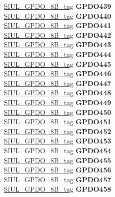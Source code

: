 \begin{DoxyCompactItemize}
\begin{tabbing}
\>\>\mbox{\hyperlink{unionSIUL__GPDO__8B__tag}{SIUL\_GPDO\_8B\_tag}} {\bfseries GPDO439}\\
\>\>\mbox{\hyperlink{unionSIUL__GPDO__8B__tag}{SIUL\_GPDO\_8B\_tag}} {\bfseries GPDO440}\\
\>\>\mbox{\hyperlink{unionSIUL__GPDO__8B__tag}{SIUL\_GPDO\_8B\_tag}} {\bfseries GPDO441}\\
\>\>\mbox{\hyperlink{unionSIUL__GPDO__8B__tag}{SIUL\_GPDO\_8B\_tag}} {\bfseries GPDO442}\\
\>\>\mbox{\hyperlink{unionSIUL__GPDO__8B__tag}{SIUL\_GPDO\_8B\_tag}} {\bfseries GPDO443}\\
\>\>\mbox{\hyperlink{unionSIUL__GPDO__8B__tag}{SIUL\_GPDO\_8B\_tag}} {\bfseries GPDO444}\\
\>\>\mbox{\hyperlink{unionSIUL__GPDO__8B__tag}{SIUL\_GPDO\_8B\_tag}} {\bfseries GPDO445}\\
\>\>\mbox{\hyperlink{unionSIUL__GPDO__8B__tag}{SIUL\_GPDO\_8B\_tag}} {\bfseries GPDO446}\\
\>\>\mbox{\hyperlink{unionSIUL__GPDO__8B__tag}{SIUL\_GPDO\_8B\_tag}} {\bfseries GPDO447}\\
\>\>\mbox{\hyperlink{unionSIUL__GPDO__8B__tag}{SIUL\_GPDO\_8B\_tag}} {\bfseries GPDO448}\\
\>\>\mbox{\hyperlink{unionSIUL__GPDO__8B__tag}{SIUL\_GPDO\_8B\_tag}} {\bfseries GPDO449}\\
\>\>\mbox{\hyperlink{unionSIUL__GPDO__8B__tag}{SIUL\_GPDO\_8B\_tag}} {\bfseries GPDO450}\\
\>\>\mbox{\hyperlink{unionSIUL__GPDO__8B__tag}{SIUL\_GPDO\_8B\_tag}} {\bfseries GPDO451}\\
\>\>\mbox{\hyperlink{unionSIUL__GPDO__8B__tag}{SIUL\_GPDO\_8B\_tag}} {\bfseries GPDO452}\\
\>\>\mbox{\hyperlink{unionSIUL__GPDO__8B__tag}{SIUL\_GPDO\_8B\_tag}} {\bfseries GPDO453}\\
\>\>\mbox{\hyperlink{unionSIUL__GPDO__8B__tag}{SIUL\_GPDO\_8B\_tag}} {\bfseries GPDO454}\\
\>\>\mbox{\hyperlink{unionSIUL__GPDO__8B__tag}{SIUL\_GPDO\_8B\_tag}} {\bfseries GPDO455}\\
\>\>\mbox{\hyperlink{unionSIUL__GPDO__8B__tag}{SIUL\_GPDO\_8B\_tag}} {\bfseries GPDO456}\\
\>\>\mbox{\hyperlink{unionSIUL__GPDO__8B__tag}{SIUL\_GPDO\_8B\_tag}} {\bfseries GPDO457}\\
\>\>\mbox{\hyperlink{unionSIUL__GPDO__8B__tag}{SIUL\_GPDO\_8B\_tag}} {\bfseries GPDO458}\\

\end{tabbing}
\end{DoxyCompactItemize}
